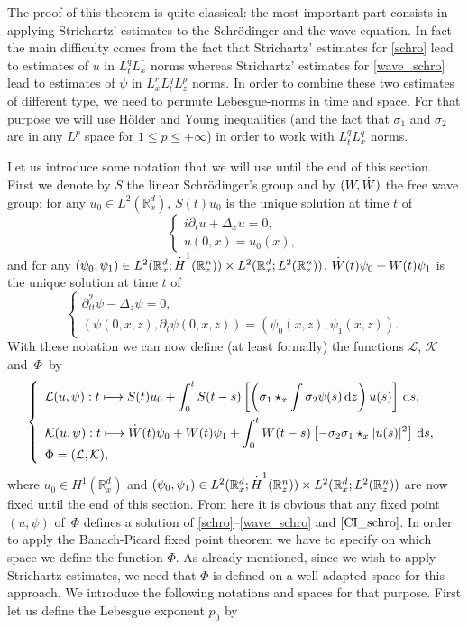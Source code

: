 \documentclass[11pt]{article}
\DeclareRobustCommand{\accentset}[2]{\overset{#1}{#2}}
\theoremstyle{definition}
\newcommand*{\overbigdot}[1]{%
\accentset{\mbox{\large\bfseries .}}{#1}}
\newcommand{\R}{\mathbb{R}}
\let\ds\displaystyle
\newcommand{\ud}{\, {\mathrm{d}}}
\begin{document}
The proof of this theorem is quite classical: the most important part consists in applying Strichartz' estimates to the Schrödinger and the wave equation. In fact the main difficulty comes from the fact that Strichartz' estimates for \eqref{schro} lead to estimates of $u$ in $L_{t}^{q}L_{x}^{r}$ norms whereas Strichartz' estimates for \eqref{wave_schro} lead to estimates of $\psi$ in $L_{x}^{r}L_{t}^{q}L_{z}^{p}$ norms. In order to combine these two estimates
of different type,
we need to permute Lebesgue-norms in time and space. For that purpose we will use Hölder and Young inequalities (and the fact that $\sigma_{1}$ and $\sigma_{2}$ are in any $L^{p}$ space for $1\leq p\leq+\infty$) in order to work with $L_{t}^{q}L_{x}^{q}$ norms.

Let us introduce some notation that we will use until the end of this section. First we denote by $S$ the linear Schrödinger's group and by $(W,\overbigdot{W})$ the free wave group: for any $u_{0}\in L^{2}(\R_{x}^{d})$, $S(t)u_{0}$ is the unique solution at time $t$ of
\[
\left\{\begin{array}{l}
\ds i\partial_{t}u+\Delta_{x}u=0,\\
\ds u(0,x)=u_{0}(x),
\end{array}\right.
\]
and for any $(\psi_{0},\psi_{1})\in L^{2}(\R_{x}^{d};\overbigdot{H}^{1}(\R_{z}^{n}))\times L^{2}(\R_{x}^{d};L^{2}(\R_{z}^{n}))$, $\overbigdot{W}(t)\psi_{0}+W(t)\psi_{1}$ is the unique solution at time $t$ of
\[
\left\{\begin{array}{l}
\ds \partial_{tt}^{2}\psi-\Delta_{z}\psi=0,\\[3pt]
\ds (\psi(0,x,z),\partial_{t}\psi(0,x,z))=(\psi_{0}(x,z),\psi_{1}(x,z)).
\end{array}\right.
\]
With these notation we can now define (at least formally) the functions $\mathcal{L}$, $\mathcal{K}$ and~$\Phi$~by
\[
\left\{\begin{array}{l}
\ds \mathcal{L}(u,\psi):t\longmapsto S(t)u_{0}+\int_{0}^{t}S(t-s)\left[\left(\sigma_{1}\star_{x}\int\sigma_{2}\psi(s)\ud z\right)u(s)\right]\ud s,\\[10pt]
\ds\mathcal{K}(u,\psi):t\longmapsto \overbigdot{W}(t)\psi_{0}+W(t)\psi_{1}+\int_{0}^{t}W(t-s)\left[-\sigma_{2}\sigma_{1}\star_{x}|u(s)|^{2}\right]\ud s,\\
\Phi=(\mathcal{L},\mathcal{K}),
\end{array}\right.
\]
where $u_{0}\in H^{1}(\R_{x}^{d})$ and $(\psi_{0},\psi_{1})\in L^{2}(\R_{x}^{d};\overbigdot{H}^{1}(\R_{z}^{n}))\times L^{2}(\R_{x}^{d};L^{2}(\R_{z}^{n}))$ are now fixed until the end of this section. From here it is obvious that any fixed point $(u,\psi)$ of~$\Phi$ defines a solution of \eqref{schro}--\eqref{wave_schro} and $\eqref{CI_schro}$. In order to apply the Banach-Picard fixed point theorem we have to specify on which space we define the function $\Phi$. As already mentioned, since we wish to apply Strichartz estimates, we need that $\Phi$ is defined on a well adapted space for this approach. We introduce the following notations and spaces for that purpose. First let us define the Lebesgue exponent $p_{0}$ by
\end{document}
